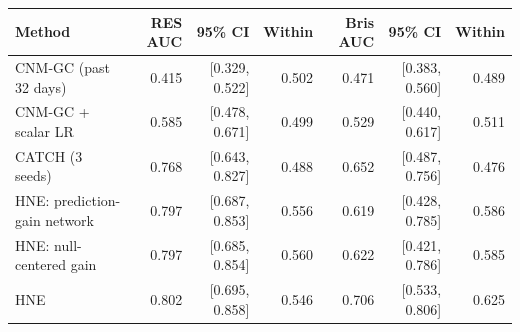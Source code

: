 \begin{tabular}{lrrrrrr}
\toprule
Method & RES AUC & 95\% CI & Within & Bris AUC & 95\% CI & Within \\
\midrule
CNM-GC (past 32 days) & 0.415 & [0.329, 0.522] & 0.502 & 0.471 & [0.383, 0.560] & 0.489 \\
CNM-GC + scalar LR & 0.585 & [0.478, 0.671] & 0.499 & 0.529 & [0.440, 0.617] & 0.511 \\
CATCH (3 seeds) & 0.768 & [0.643, 0.827] & 0.488 & 0.652 & [0.487, 0.756] & 0.476 \\
HNE: prediction-gain network & 0.797 & [0.687, 0.853] & 0.556 & 0.619 & [0.428, 0.785] & 0.586 \\
HNE: null-centered gain & 0.797 & [0.685, 0.854] & 0.560 & 0.622 & [0.421, 0.786] & 0.585 \\
HNE & 0.802 & [0.695, 0.858] & 0.546 & 0.706 & [0.533, 0.806] & 0.625 \\
\bottomrule
\end{tabular}